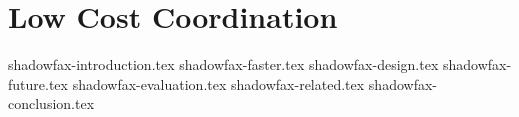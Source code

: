 \chapter{Low Cost Coordination}

 {shadowfax-introduction.tex}
 {shadowfax-faster.tex}
 {shadowfax-design.tex}
 {shadowfax-future.tex}
 {shadowfax-evaluation.tex}
 {shadowfax-related.tex}
 {shadowfax-conclusion.tex}
